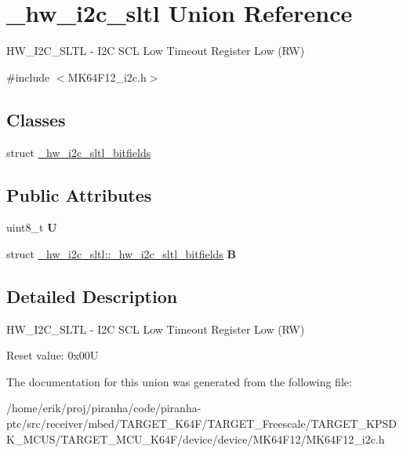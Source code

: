 \hypertarget{union__hw__i2c__sltl}{}\section{\+\_\+hw\+\_\+i2c\+\_\+sltl Union Reference}
\label{union__hw__i2c__sltl}


H\+W\+\_\+\+I2\+C\+\_\+\+S\+L\+TL -\/ I2C S\+CL Low Timeout Register Low (RW)  




{\ttfamily \#include $<$M\+K64\+F12\+\_\+i2c.\+h$>$}

\subsection*{Classes}
\begin{DoxyCompactItemize}
\item 
struct \hyperlink{struct__hw__i2c__sltl_1_1__hw__i2c__sltl__bitfields}{\+\_\+hw\+\_\+i2c\+\_\+sltl\+\_\+bitfields}
\end{DoxyCompactItemize}
\subsection*{Public Attributes}
\begin{DoxyCompactItemize}
\item 
uint8\+\_\+t {\bfseries U}\hypertarget{union__hw__i2c__sltl_adc990241ab34b0517f9e50eb7e1d2015}{}\label{union__hw__i2c__sltl_adc990241ab34b0517f9e50eb7e1d2015}

\item 
struct \hyperlink{struct__hw__i2c__sltl_1_1__hw__i2c__sltl__bitfields}{\+\_\+hw\+\_\+i2c\+\_\+sltl\+::\+\_\+hw\+\_\+i2c\+\_\+sltl\+\_\+bitfields} {\bfseries B}\hypertarget{union__hw__i2c__sltl_a39df77f4a048f917bf0af25e2e09949c}{}\label{union__hw__i2c__sltl_a39df77f4a048f917bf0af25e2e09949c}

\end{DoxyCompactItemize}


\subsection{Detailed Description}
H\+W\+\_\+\+I2\+C\+\_\+\+S\+L\+TL -\/ I2C S\+CL Low Timeout Register Low (RW) 

Reset value\+: 0x00U 

The documentation for this union was generated from the following file\+:\begin{DoxyCompactItemize}
\item 
/home/erik/proj/piranha/code/piranha-\/ptc/src/receiver/mbed/\+T\+A\+R\+G\+E\+T\+\_\+\+K64\+F/\+T\+A\+R\+G\+E\+T\+\_\+\+Freescale/\+T\+A\+R\+G\+E\+T\+\_\+\+K\+P\+S\+D\+K\+\_\+\+M\+C\+U\+S/\+T\+A\+R\+G\+E\+T\+\_\+\+M\+C\+U\+\_\+\+K64\+F/device/device/\+M\+K64\+F12/M\+K64\+F12\+\_\+i2c.\+h\end{DoxyCompactItemize}
